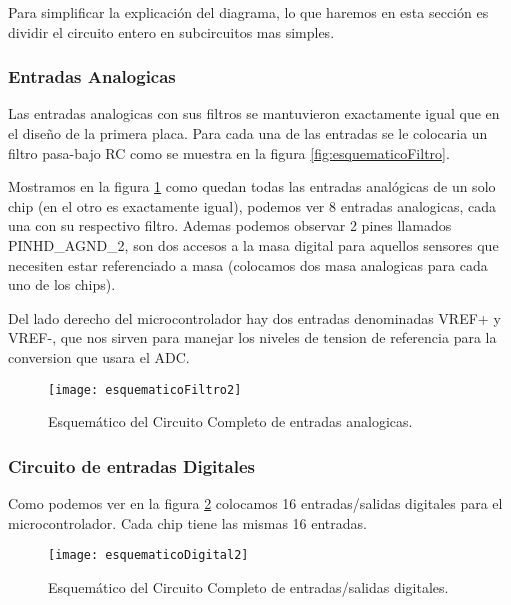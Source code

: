 Para simplificar la explicación del diagrama, lo que haremos en esta sección es dividir el circuito entero en subcircuitos mas simples.

\subsubsection{Entradas Analogicas}
\label{subsub: entradas_analogicas2}

Las entradas analogicas con sus filtros se mantuvieron exactamente igual que en el diseño de la primera placa. Para cada una de las entradas se le colocaria un filtro pasa-bajo RC como se muestra en la figura \ref{fig:esquematicoFiltro}.

Mostramos en la figura \ref{fig:esquematicoFiltro2} como quedan todas las entradas analógicas de un solo chip (en el otro es exactamente igual), podemos ver 8 entradas analogicas, cada una con su respectivo filtro. Ademas podemos observar 2 pines llamados PINHD\_AGND\_2, son dos accesos a la masa digital para aquellos sensores que necesiten estar referenciado a masa (colocamos dos masa analogicas para cada uno de los chips).

Del lado derecho del microcontrolador hay dos entradas denominadas VREF+ y VREF-, que nos sirven para manejar los niveles de tension de referencia para la conversion que usara el ADC.

\begin{figure}[H]
\centering
  \texttt{[image: esquematicoFiltro2]}
  \caption{Esquemático del Circuito Completo de entradas analogicas.}\label{fig:esquematicoFiltro2}
\end{figure}


\subsubsection{Circuito de entradas Digitales}
\label{subsub:entradas_digitales}

Como podemos ver en la figura \ref{fig:esquematicoDigital2} colocamos 16 entradas/salidas digitales para el microcontrolador. Cada chip tiene las mismas 16 entradas.

\begin{figure}  [H]
\centering
  \texttt{[image: esquematicoDigital2]}
  \caption{Esquemático del Circuito Completo de entradas/salidas digitales.}\label{fig:esquematicoDigital2}
\end{figure}


